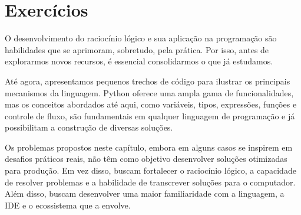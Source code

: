 \chapter{Exercícios}\label{ex}

O desenvolvimento do raciocínio lógico e sua aplicação na programação são habilidades que se aprimoram, sobretudo, pela
prática.
Por isso, antes de explorarmos novos recursos, é essencial consolidarmos o que já estudamos.

Até agora, apresentamos pequenos trechos de código para ilustrar os principais mecanismos da linguagem.
Python oferece uma ampla gama de funcionalidades, mas os conceitos abordados até aqui, como variáveis,
tipos, expressões, funções e controle de fluxo, são fundamentais em qualquer linguagem de programação
e já possibilitam a construção de diversas soluções.


Os problemas propostos neste capítulo, embora em alguns casos se inspirem em desafios práticos reais, não têm como
objetivo desenvolver soluções otimizadas para produção.
Em vez disso, buscam fortalecer o raciocínio lógico, a capacidade de resolver problemas e a habilidade de transcrever
soluções para o computador.
Além disso, buscam desenvolver uma maior familiaridade com a linguagem, a IDE e o ecossistema que a envolve.

